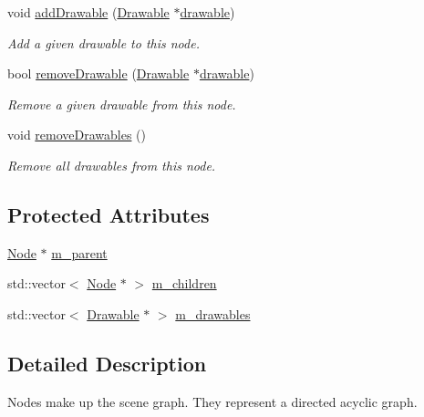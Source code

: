 \begin{DoxyCompactItemize}
void \mbox{\hyperlink{classec_1_1_node_aef615bcf1c24225838e00c15d03dc707}{add\+Drawable}} (\mbox{\hyperlink{classec_1_1_drawable}{Drawable}} $\ast$\mbox{\hyperlink{_resource_type_8h_a0e08bf97f986b1083a00d3f004fb04f7}{drawable}})
\begin{DoxyCompactList}\small\item\em Add a given drawable to this node. \end{DoxyCompactList}\item 
bool \mbox{\hyperlink{classec_1_1_node_a20231d84c538f7dea43836b3e44376a7}{remove\+Drawable}} (\mbox{\hyperlink{classec_1_1_drawable}{Drawable}} $\ast$\mbox{\hyperlink{_resource_type_8h_a0e08bf97f986b1083a00d3f004fb04f7}{drawable}})
\begin{DoxyCompactList}\small\item\em Remove a given drawable from this node. \end{DoxyCompactList}\item 
void \mbox{\hyperlink{classec_1_1_node_a57fd7f0d158527df372880399ca48002}{remove\+Drawables}} ()
\begin{DoxyCompactList}\small\item\em Remove all drawables from this node. \end{DoxyCompactList}\end{DoxyCompactItemize}
\subsection*{Protected Attributes}
\begin{DoxyCompactItemize}
\item 
\mbox{\hyperlink{classec_1_1_node}{Node}} $\ast$ \mbox{\hyperlink{classec_1_1_node_a9f5373bd3ba5bfed53894223adcfe791}{m\+\_\+parent}}
\item 
std\+::vector$<$ \mbox{\hyperlink{classec_1_1_node}{Node}} $\ast$ $>$ \mbox{\hyperlink{classec_1_1_node_a648e1758013c7fc5899cbff2f8fe41fa}{m\+\_\+children}}
\item 
std\+::vector$<$ \mbox{\hyperlink{classec_1_1_drawable}{Drawable}} $\ast$ $>$ \mbox{\hyperlink{classec_1_1_node_aa9f624971a4906674148117ba4442c01}{m\+\_\+drawables}}
\end{DoxyCompactItemize}


\subsection{Detailed Description}
Nodes make up the scene graph. They represent a directed acyclic graph. 

